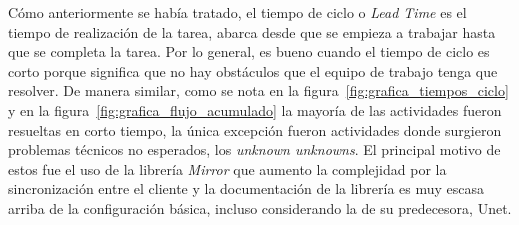 Cómo anteriormente se había tratado, el tiempo de ciclo o \textit{Lead Time} es el tiempo de realización de la tarea, abarca desde que se empieza a trabajar hasta que se completa la tarea. Por lo general, es bueno cuando el tiempo de ciclo es corto porque significa que no hay obstáculos que el equipo de trabajo tenga que resolver. De manera similar, como se nota en la figura~\ref{fig:grafica_tiempos_ciclo} y en la figura~\ref{fig:grafica_flujo_acumulado} la mayoría de las actividades fueron resueltas en corto tiempo, la única excepción fueron actividades donde surgieron problemas técnicos no esperados, los \textit{unknown unknowns}. El principal motivo de estos fue el uso de la librería \textit{Mirror} que aumento la complejidad por la sincronización entre el cliente y la documentación de la librería es muy escasa arriba de la configuración básica, incluso considerando la de su predecesora, Unet.

